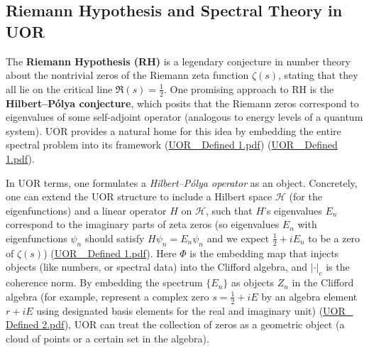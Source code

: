 \documentclass[12pt]{article}
\begin{document}
\subsection{Riemann Hypothesis and Spectral Theory in UOR}

The \textbf{Riemann Hypothesis (RH)} is a legendary conjecture in number theory about the nontrivial zeros of the Riemann zeta function $\zeta(s)$, stating that they all lie on the critical line $\Re(s) = \frac{1}{2}$. One promising approach to RH is the \textbf{Hilbert--P\'olya conjecture}, which posits that the Riemann zeros correspond to eigenvalues of some self-adjoint operator (analogous to energy levels of a quantum system). UOR provides a natural home for this idea by embedding the entire spectral problem into its framework (\href{file://file-XiorGa5Wu6KTrCZGytuVSc#:~:text=3,UOR%20Terms}{UOR\_ Defined 1.pdf}) (\href{file://file-XiorGa5Wu6KTrCZGytuVSc#:~:text=Hilbert%E2%80%93P%C3%B3lya%20Conjecture%20,correspond%20to%20the%20imaginary}{UOR\_ Defined 1.pdf}).

\medskip

In UOR terms, one formulates a \emph{Hilbert--P\'olya operator} as an object. Concretely, one can extend the UOR structure to include a Hilbert space $\mathcal{H}$ (for the eigenfunctions) and a linear operator $H$ on $\mathcal{H}$, such that $H$’s eigenvalues $E_n$ correspond to the imaginary parts of zeta zeros (so eigenvalues $E_n$ with eigenfunctions $\psi_n$ should satisfy $H\psi_n = E_n \psi_n$ and we expect $\frac{1}{2} + iE_n$ to be a zero of $\zeta(s)$) (\href{file://file-XiorGa5Wu6KTrCZGytuVSc#:~:text=match%20at%20L806%20Conjecture%20,adjoint%20operator%20%24H%3A%5Cmathcal%7BH%7D%5Cto%5Cmathcal%7BH%7D%24%20such%20that}{UOR\_ Defined 1.pdf}). Here $\Phi$ is the embedding map that injects objects (like numbers, or spectral data) into the Clifford algebra, and $\lvert\cdot\rvert_c$ is the coherence norm. By embedding the spectrum $\{E_n\}$ as objects $Z_n$ in the Clifford algebra (for example, represent a complex zero $s = \frac{1}{2} + iE$ by an algebra element $r + iE$ using designated basis elements for the real and imaginary unit) (\href{file://file-TBF3nHDaRR5QeVMmwCFYkp#:~:text=Riemann%20zeta%20function%2C%20%24D%24%20could,to%20D%24%20of}{UOR\_ Defined 2.pdf}), UOR can treat the collection of zeros as a geometric object (a cloud of points or a certain set in the algebra).

\medskip
\end{document}
